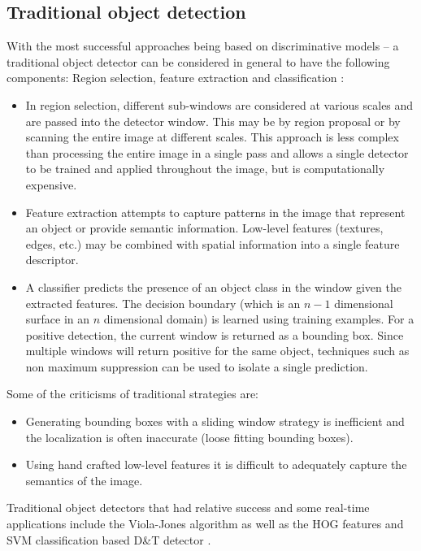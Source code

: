 \documentclass[a4paper,twoside,12pt]{report}
\begin{document}
\subsection{Traditional object detection}

With the most successful approaches being based on discriminative models -- a traditional object detector can be considered in general to have the following components:  Region selection, feature extraction and classification \citep{deepreview}:

\begin{itemize}
    \item In region selection, different sub-windows are considered at various scales and are passed into the detector window. This may be by region proposal or by scanning the entire image at different scales. This approach is less complex than processing the entire image in a single pass and allows a single detector to be trained and applied throughout the image, but is computationally expensive. 
    \item Feature extraction attempts to capture patterns in the image that represent an object or provide semantic information. Low-level features (textures, edges, etc.) may be combined with spatial information into a single feature descriptor.
    \item A classifier predicts the presence of an object class in the window given the extracted features. The decision boundary (which is an $n-1$ dimensional surface in an $n$ dimensional domain) is learned using training examples. For a positive detection, the current window is returned as a bounding box. Since multiple windows will return positive for the same object, techniques such as non maximum suppression can be used to isolate a single prediction.
\end{itemize}

\noindent Some of the criticisms of traditional strategies are: 
\begin{itemize}
    \setlength\itemsep{0em}
    \item Generating bounding boxes with a sliding window strategy is inefficient and the localization is often inaccurate (loose fitting bounding boxes).
    \item Using hand crafted low-level features it is difficult to adequately capture the semantics of the image.
\end{itemize}

Traditional object detectors that had relative success and some real-time applications include the Viola-Jones algorithm \citep{vjdet} as well as the HOG features and SVM classification based D\&T detector \citep{hog}. 
\end{document}
